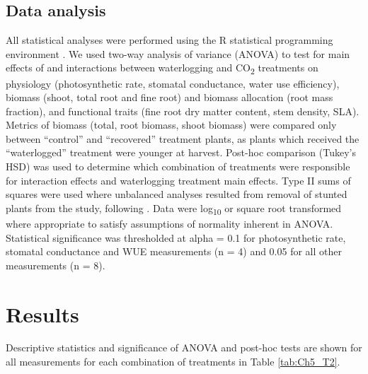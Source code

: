 \documentclass[12pt,a4paper]{memoir}
\begin{document}
\subsection*{Data analysis}
All statistical analyses were performed using the R statistical programming environment  \citep{RCoreTeam2015}. We used two-way analysis of variance (ANOVA) to test for main effects of and interactions between waterlogging and CO\textsubscript{2} treatments on physiology (photosynthetic rate, stomatal conductance, water use efficiency), biomass (shoot, total root and fine root) and biomass allocation (root mass fraction), and functional traits (fine root dry matter content, stem density, SLA). Metrics of biomass (total, root biomass, shoot biomass) were compared only between “control” and “recovered” treatment plants, as plants which received the “waterlogged” treatment were younger at harvest. Post-hoc comparison (Tukey’s HSD) was used to determine which combination of treatments were responsible for interaction effects and waterlogging treatment main effects. Type II sums of squares were used where unbalanced analyses resulted from removal of stunted plants from the study, following \citep{Langsrud2003}. Data were log\textsubscript{10} or square root transformed where appropriate to satisfy assumptions of normality inherent in ANOVA. Statistical significance was thresholded at alpha = 0.1 for photosynthetic rate, stomatal conductance and WUE measurements (n = 4) and 0.05 for all other measurements (n = 8).

\section{Results}
Descriptive statistics and significance of ANOVA and post-hoc tests are shown for all measurements for each combination of treatments in Table \ref{tab:Ch5_T2}. 
\end{document}
